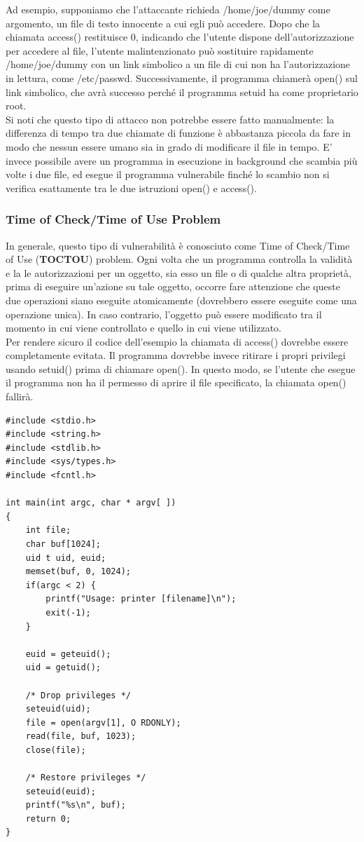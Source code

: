 Ad esempio, supponiamo che l'attaccante richieda /home/joe/dummy come argomento, un file di testo innocente a cui egli può accedere. Dopo che la chiamata access() restituisce 0, indicando che l'utente dispone dell'autorizzazione per accedere al file, l'utente malintenzionato può sostituire rapidamente /home/joe/dummy con un link simbolico a un file di cui non ha l'autorizzazione in lettura, come /etc/passwd. Successivamente, il programma chiamerà open() sul link simbolico, che avrà successo perché il programma setuid ha come proprietario
root. \\

Si noti che questo tipo di attacco non potrebbe essere fatto manualmente: la differenza di tempo tra due chiamate di funzione è abbastanza piccola da fare in modo che nessun essere umano sia in grado di modificare il file in tempo. E’ invece possibile avere un programma in esecuzione in background che scambia più volte i due file, ed esegue il programma vulnerabile finché lo scambio non si verifica esattamente tra le due istruzioni open() e access().

\subsubsection{Time of Check/Time of Use Problem}
In generale, questo tipo di vulnerabilità è conosciuto come Time of Check/Time of Use (\textbf{TOCTOU}) problem. Ogni volta che un programma controlla la validità e la le autorizzazioni per un oggetto, sia esso un file o di qualche altra proprietà, prima di eseguire un'azione su tale oggetto, occorre fare attenzione che queste due operazioni siano eseguite atomicamente (dovrebbero essere eseguite come una operazione unica). In caso contrario, l'oggetto può essere modificato tra il momento in cui viene controllato e quello in cui viene utilizzato. \\

Per rendere sicuro il codice dell'esempio la chiamata di access() dovrebbe essere completamente evitata. Il programma dovrebbe invece ritirare i propri privilegi usando setuid() prima di chiamare open(). In questo modo, se l'utente che esegue il programma non ha il permesso di aprire il file specificato, la chiamata open() fallirà.
\begin{algorithm}
\begin{lstlisting}[caption={Esempio codice sicuro}]
#include <stdio.h>
#include <string.h>
#include <stdlib.h>
#include <sys/types.h>
#include <fcntl.h>

int main(int argc, char * argv[ ])
{
	int file;
	char buf[1024];
	uid t uid, euid;
	memset(buf, 0, 1024);
	if(argc < 2) {
		printf("Usage: printer [filename]\n");
		exit(-1);
	}
	
	euid = geteuid();
	uid = getuid();
	
	/* Drop privileges */
	seteuid(uid);
	file = open(argv[1], O RDONLY);
	read(file, buf, 1023);
	close(file);

	/* Restore privileges */
	seteuid(euid);
	printf("%s\n", buf);
	return 0;
}
\end{lstlisting}
\end{algorithm}